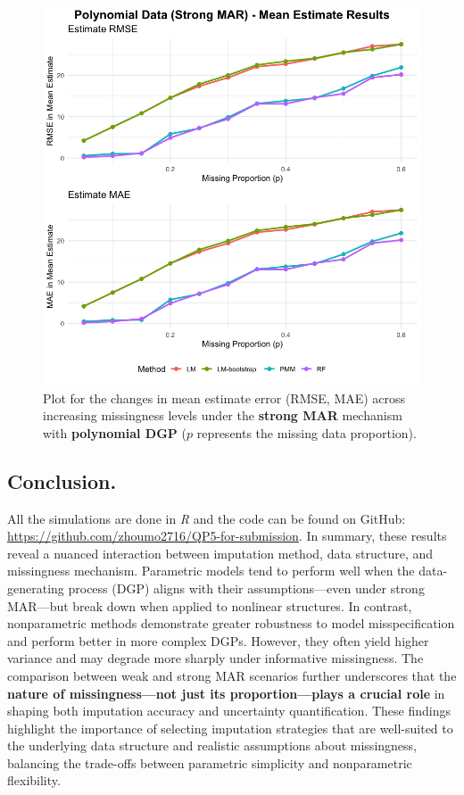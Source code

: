 \documentclass[12pt,oneside]{amsart}
\theoremstyle{definition}
\theoremstyle{remark}
\numberwithin{equation}{section}
\begin{document}
\begin{figure}[ht]
\begin{minipage}[b]{0.48\linewidth}
        \includegraphics[width=\linewidth]{Report/Figure/mean_poly_mar.jpg}
        \caption{Plot for the changes in mean estimate error (RMSE, MAE) across increasing missingness levels under the \textbf{strong MAR} mechanism with \textbf{polynomial DGP} ($p$ represents the missing data proportion).}
        \label{fig:mean_poly_mar}
    \end{minipage}
\end{figure}
\subsection{Conclusion.}
All the simulations are done in \textit{R} and the code can be found on GitHub: \url {https://github.com/zhoumo2716/QP5-for-submission}. In summary, these results reveal a nuanced interaction between imputation method, data structure, and missingness mechanism. Parametric models tend to perform well when the data-generating process (DGP) aligns with their assumptions—even under strong MAR—but break down when applied to nonlinear structures. In contrast, nonparametric methods demonstrate greater robustness to model misspecification and perform better in more complex DGPs. However, they often yield higher variance and may degrade more sharply under informative missingness. The comparison between weak and strong MAR scenarios further underscores that the \textbf{nature of missingness—not just its proportion—plays a crucial role} in shaping both imputation accuracy and uncertainty quantification. These findings highlight the importance of selecting imputation strategies that are well-suited to the underlying data structure and realistic assumptions about missingness, balancing the trade-offs between parametric simplicity and nonparametric flexibility. 

\clearpage
\printbibliography
\end{document}
